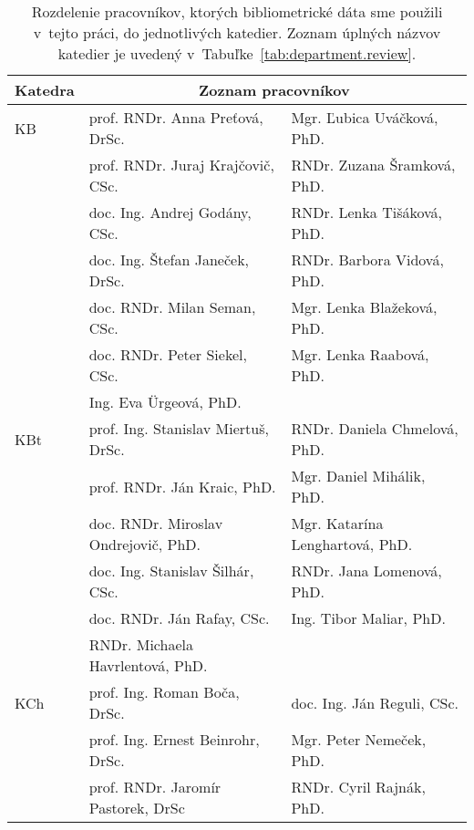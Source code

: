 \begin{table}
  \centering\small
  \caption[Rozdelenie pracovníkov do jednotlivých katedier]%
  {Rozdelenie pracovníkov, ktorých bibliometrické dáta sme použili v~tejto
    práci, do jednotlivých katedier.  Zoznam úplných názvov katedier je uvedený
    v~Tabuľke~\ref{tab:department.review}.}
  \label{tab:staff.list}
  \begin{tabularx}{\textwidth}{lll}
    \toprule
    Katedra & \multicolumn{2}{c}{Zoznam pracovníkov} \\
    \midrule
    KB   & prof. RNDr. Anna Preťová, DrSc.            & Mgr. Ľubica Uváčková, PhD.        \\
         & prof. RNDr. Juraj Krajčovič, CSc.          & RNDr. Zuzana Šramková, PhD.       \\
         & doc. Ing. Andrej Godány, CSc.              & RNDr. Lenka Tišáková, PhD.        \\
         & doc. Ing. Štefan Janeček, DrSc.            & RNDr. Barbora Vidová, PhD.        \\
         & doc. RNDr. Milan Seman, CSc.               & Mgr. Lenka Blažeková, PhD.        \\
         & doc. RNDr. Peter Siekel, CSc.              & Mgr. Lenka Raabová, PhD.          \\
         & Ing. Eva Ürgeová, PhD.                     &                                   \\[2ex]
    KBt  & prof. Ing. Stanislav Miertuš, DrSc.        & RNDr. Daniela Chmelová, PhD.      \\
         & prof. RNDr. Ján Kraic, PhD.                & Mgr. Daniel Mihálik, PhD.         \\
         & doc. RNDr. Miroslav Ondrejovič, PhD.       & Mgr. Katarína Lenghartová, PhD.   \\
         & doc. Ing. Stanislav Šilhár, CSc.           & RNDr. Jana Lomenová, PhD.         \\
         & doc. RNDr. Ján Rafay, CSc.                 & Ing. Tibor Maliar, PhD.           \\
         & RNDr. Michaela Havrlentová, PhD.           &                                   \\[2ex]
    KCh  & prof. Ing. Roman Boča, DrSc.               & doc. Ing. Ján Reguli, CSc.        \\
         & prof. Ing. Ernest Beinrohr, DrSc.          & Mgr. Peter Nemeček, PhD.          \\
         & prof. RNDr. Jaromír Pastorek, DrSc         & RNDr. Cyril Rajnák, PhD.          \\

\end{tabularx}
\end{table}
